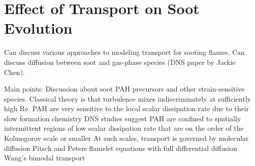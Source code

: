 \section{Effect of Transport on Soot Evolution}
\label{sec:intro:transport}

Can discuss various approaches to modeling transport for sooting flames. Can discuss diffusion between soot and gas-phase species (DNS paper by Jackie Chen).

Main points:
Discussion about soot PAH precursors and other strain-sensitive species.
Classical theory is that turbulence mixes indiscriminately at sufficiently high Re.
PAH are very sensitive to the local scalar dissipation rate due to their slow formation chemistry
DNS studies suggest PAH are confined to spatially intermittent regions of low scalar dissipation rate that are on the order of the Kolmogorov scale or smaller
At such scales, transport is governed by molecular diffusion
Pitsch and Peters flamelet equations with full differential diffusion
Wang's bimodal transport
